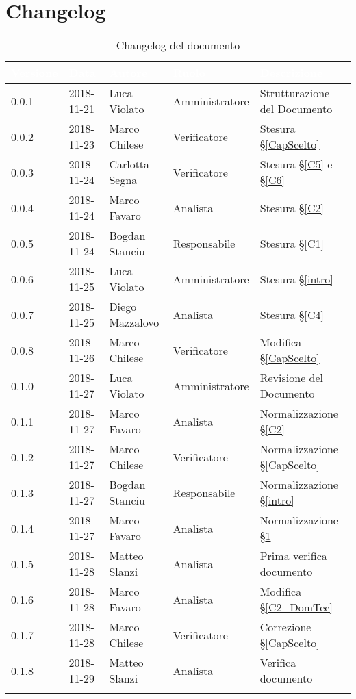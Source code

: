 \section{Changelog}\label{changelog}

\begin{center}
\begin{longtable}[c]{|m{}|m{}|m{}|m{}|p{}|}
\hline
\rowcolor{bluelogo}\textbf{\textcolor{white}{Versione}} & \textbf{\textcolor{white}{Data}} & \textbf{\textcolor{white}{Autore}} & \textbf{\textcolor{white}{Ruolo}} & \textbf{\textcolor{white}{Descrizione}} \\
\hline \hline
\endfirsthead
0.0.1 & 2018-11-21 & Luca Violato & Amministratore & Strutturazione del Documento \\
\hline
\rowcolor{grigio}0.0.2 & 2018-11-23 & Marco Chilese & Verificatore & Stesura §\ref{CapScelto} \\
\hline
0.0.3 & 2018-11-24 & Carlotta Segna & Verificatore & Stesura §\ref{C5} e §\ref{C6} \\
\hline
\rowcolor{grigio}0.0.4 & 2018-11-24 & Marco Favaro & Analista & Stesura §\ref{C2} \\
\hline
0.0.5 & 2018-11-24 & Bogdan Stanciu & Responsabile & Stesura §\ref{C1}\\
\hline
\rowcolor{grigio}0.0.6 & 2018-11-25 & Luca Violato & Amministratore & Stesura §\ref{intro}\\
\hline
0.0.7 & 2018-11-25 & Diego Mazzalovo & Analista & Stesura §\ref{C4} \\
\hline
\rowcolor{grigio}0.0.8 & 2018-11-26 & Marco Chilese & Verificatore & Modifica §\ref{CapScelto} \\
\hline
0.1.0 & 2018-11-27 & Luca Violato & Amministratore & Revisione del Documento\\
\hline
\rowcolor{grigio}0.1.1 & 2018-11-27 & Marco Favaro & Analista & Normalizzazione §\ref{C2}\\
\hline
0.1.2 & 2018-11-27 & Marco Chilese & Verificatore & Normalizzazione §\ref{CapScelto}\\
\hline
\rowcolor{grigio}0.1.3 & 2018-11-27 & Bogdan Stanciu & Responsabile & Normalizzazione §\ref{intro}\\
\hline
0.1.4 & 2018-11-27 & Marco Favaro & Analista & Normalizzazione §\ref{changelog}\\
\hline
\rowcolor{grigio}0.1.5 & 2018-11-28 & Matteo Slanzi & Analista & Prima verifica documento\\
\hline
0.1.6 & 2018-11-28 & Marco Favaro & Analista & Modifica §\ref{C2_DomTec}\\
\hline
\rowcolor{grigio}0.1.7 & 2018-11-28 & Marco Chilese & Verificatore & Correzione §\ref{CapScelto}\\
\hline
0.1.8 & 2018-11-29 & Matteo Slanzi & Analista & Verifica documento\\
\hline
\caption{Changelog del documento}
\end{longtable}
\end{center}
